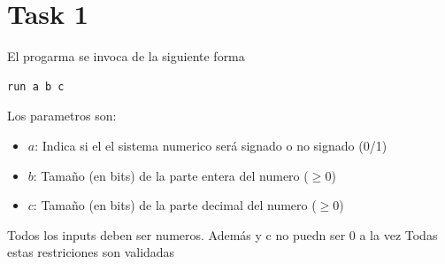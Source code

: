 
\usepackage{listings}



\section*{Task 1}

El progarma se invoca de la siguiente forma

\begin{lstlisting}
run a b c
\end{lstlisting}

Los parametros son:
\begin{itemize}
  \item $a$: Indica si el el sistema numerico será signado o no signado (0/1)
  \item $b$: Tamaño (en bits) de la parte entera del numero ($\geq0$)
  \item $c$: Tamaño (en bits) de la parte decimal del numero ($\geq0$)
\end{itemize}
Todos los inputs deben ser numeros. Además y c no puedn ser 0 a la vez
Todas estas restriciones son validadas

